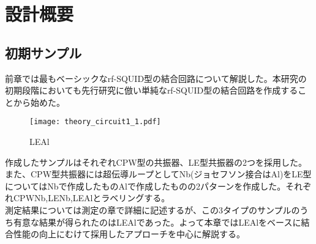 \section{設計概要}
\subsection{初期サンプル}
前章では最もベーシックなrf-SQUID型の結合回路について解説した。本研究の初期段階においても先行研究に倣い単純なrf-SQUID型の結合回路を作成することから始めた。
\begin{figure}[H]
    \centering
    \texttt{[image: theory\_circuit1\_1.pdf]}
    \caption{LEAl}
\end{figure}
作成したサンプルはそれぞれCPW型の共振器、LE型共振器の2つを採用した。また、CPW型共振器には超伝導ループとしてNb(ジョセフソン接合はAl)をLE型についてはNbで作成したものAlで作成したものの2パターンを作成した。それぞれCPWNb,LENb,LEAlとラベリングする。\\
測定結果については測定の章で詳細に記述するが、この3タイプのサンプルのうち有意な結果が得られたのはLEAlであった。よって本章ではLEAlをベースに結合性能の向上にむけて採用したアプローチを中心に解説する。\\
